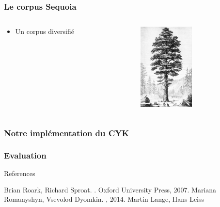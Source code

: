 \documentclass{beamer}
\begin{document}

\begin{frame}
  \frametitle{Le corpus Sequoia}
  \begin{columns}
  \begin{column}{0.5\textwidth}
    \begin{itemize}
     \item Un corpus diversifié
     
    \end{itemize}
   
  \end{column}
  
  \begin{column}{0.5\textwidth}
  \includegraphics[width=80pt,]{PSM_V03_D341_Sequoia_gigantea_of_california.jpg}  
  \end{column}

  \end{columns}

\end{frame}

\begin{frame}
\frametitle{Notre implémentation du CYK}

 
\end{frame}

\begin{frame}
\frametitle{Evaluation}

\end{frame}



\begin{frame}{References}
  \begin{thebibliography}{5}    
  \beamertemplatebookbibitems
    Brian Roark, Richard Sproat.
    .
    \newblock Oxford University Press, 2007.
  \beamertemplatearticlebibitems
    Mariana Romanyshyn, Vsevolod Dyomkin.
    , 2014.
    Martin Lange, Hans Leiss
  
  \end{thebibliography}
\end{frame}
\end{document}
